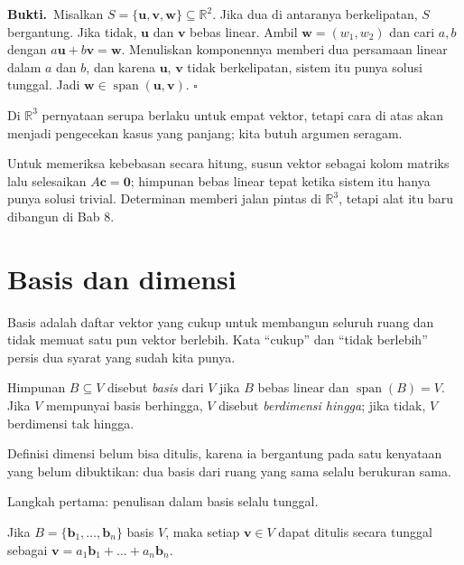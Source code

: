\par\medskip\noindent\textbf{Bukti.}\ 
Misalkan $S=\{\mathbf{u},\mathbf{v},\mathbf{w}\}\subseteq\mathbb{R}^{2}$. Jika dua di
antaranya berkelipatan, $S$ bergantung. Jika tidak, $\mathbf{u}$ dan $\mathbf{v}$ bebas
linear. Ambil $\mathbf{w}=(w_{1},w_{2})$ dan cari $a,b$ dengan
$a\mathbf{u}+b\mathbf{v}=\mathbf{w}$. Menuliskan komponennya memberi dua persamaan linear
dalam $a$ dan $b$, dan karena $\mathbf{u}$, $\mathbf{v}$ tidak berkelipatan, sistem itu punya
solusi tunggal. Jadi $\mathbf{w}\in\operatorname{span}(\mathbf{u},\mathbf{v})$.
\hfill$\square$\par\medskip

Di $\mathbb{R}^{3}$ pernyataan serupa berlaku untuk empat vektor, tetapi cara di atas akan
menjadi pengecekan kasus yang panjang; kita butuh argumen seragam.

Untuk memeriksa kebebasan secara hitung, susun vektor sebagai kolom matriks lalu selesaikan
$A\mathbf{c}=\mathbf{0}$; himpunan bebas linear tepat ketika sistem itu hanya punya solusi
trivial. Determinan memberi jalan pintas di $\mathbb{R}^{3}$, tetapi alat itu baru dibangun di
Bab 8.

\section{Basis dan dimensi}

Basis adalah daftar vektor yang cukup untuk membangun seluruh ruang dan tidak memuat satu pun
vektor berlebih. Kata ``cukup'' dan ``tidak berlebih'' persis dua syarat yang sudah kita punya.

\begin{definisi}
Himpunan $B\subseteq V$ disebut \emph{basis} dari $V$ jika $B$ bebas linear dan
$\operatorname{span}(B)=V$. Jika $V$ mempunyai basis berhingga, $V$ disebut
\emph{berdimensi hingga}; jika tidak, $V$ berdimensi tak hingga.
\end{definisi}

Definisi dimensi belum bisa ditulis, karena ia bergantung pada satu kenyataan yang belum
dibuktikan: dua basis dari ruang yang sama selalu berukuran sama.

Langkah pertama: penulisan dalam basis selalu tunggal.

\begin{lemma}
Jika $B=\{\mathbf{b}_{1},\dots,\mathbf{b}_{n}\}$ basis $V$, maka setiap $\mathbf{v}\in V$
dapat ditulis secara tunggal sebagai $\mathbf{v}=a_{1}\mathbf{b}_{1}+\dots+a_{n}\mathbf{b}_{n}$.
\end{lemma}

